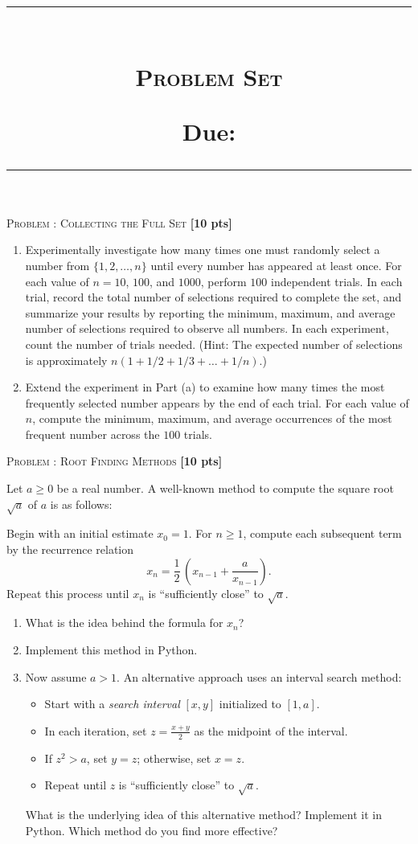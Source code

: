 \documentclass[a4paper,11pt]{article}
\title{
\hrule
\vspace{-0.5em}
\begin{multicols}{2}
\raggedright \large \textbf{\course}\\ %
\large \textsc{Problem Set \pset} \\
\vspace{0.25em}

\raggedleft \small \textbf{Due:} \due \\
\end{multicols}
\vspace{-0.3em}
\hrule}
\date{}
\author{}
\newenvironment{tcomment}[1][]{
	\begin{mdframed}[
		linecolor=black,
		linewidth=0.5pt,
		innerleftmargin=5pt,
		innerrightmargin=5pt,
		innertopmargin=5pt,
		innerbottommargin=5pt
		]
		\small\color[RGB]{70,70,70}
		\textbf{Notes:}\par\vspace{5cm}
		}{\end{mdframed}}
\newcounter{pnr}
\newenvironment{problem}[2][]{
\noindent\textsc{Problem \arabic{pnr}: #2} \hfill \textbf{[#1 pts]}\par
	\stepcounter{pnr}
	}{
	}{\vspace{0.3cm}}
\begin{document}
\maketitle
\vspace{-1cm}
\begin{problem}[10]{Collecting the Full Set}
	\begin{enumerate}
		\item Experimentally investigate how many times one must randomly select a number from $\{1, 2, \ldots, n\}$ until every number has appeared at least once. For each value of $n= 10$, $100$, and $1000$, perform $100$ independent trials. In each trial, record the total number of selections required to complete the set, and summarize your results by reporting the minimum, maximum, and average number of selections required to observe all numbers. In each experiment, count the number of trials needed. (Hint: The expected number of selections is approximately $n(1 + 1/2 + 1/3 + \dots + 1/n)$.)
		
		\item Extend the experiment in Part (a) to examine how many times the most frequently selected number appears by the end of each trial. For each value of $n$, compute the minimum, maximum, and average occurrences of the most frequent number across the $100$ trials.
	\end{enumerate}
\end{problem}

\begin{problem}[10]{Root Finding Methods}
	Let $a \geq 0$ be a real number. A well-known method to compute the square root $\sqrt{a}$ of $a$ is as follows:
	
	Begin with an initial estimate $x_0 = 1$. For $n \geq 1$, compute each subsequent term by the recurrence relation 
	\[
	x_n = \frac{1}{2}\,\left(x_{n - 1} + \frac{a}{x_{n - 1}}\right).
	\]
	Repeat this process until $x_n$ is ``sufficiently close'' to $\sqrt{a}$.
	
	\begin{enumerate}
		\item What is the idea behind the formula for $x_n$?
		
		\item Implement this method in Python.
		
		\item Now assume $a > 1$. An alternative approach uses an interval search method:
		\begin{itemize}
			\item Start with a \emph{search interval} $[x,y]$ initialized to $[1, a]$.
			\item In each iteration, set $z = \frac{x + y}{2}$ as the midpoint of the interval.
			\item If $z^2 > a$, set $y = z$; otherwise, set $x = z$.
			\item Repeat until $z$ is ``sufficiently close'' to $\sqrt{a}$.
		\end{itemize}
		What is the underlying idea of this alternative method? Implement it in Python. Which method do you find more effective?
	\end{enumerate}
\end{problem}
\end{document}
